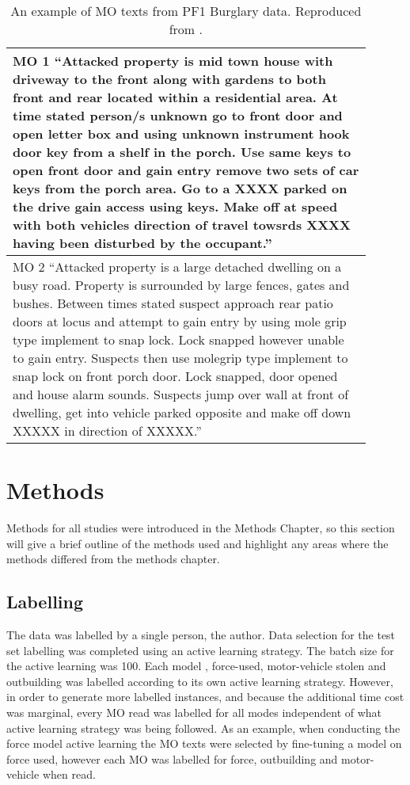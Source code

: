 \begin{table}[]
\begin{tabular}{p{0.9\linewidth}}
\toprule
MO 1 “Attacked property is mid town house with driveway to the front along with gardens to both front and rear located within a residential area. At time stated person/s unknown go to front door and open letter box and using unknown instrument hook door key from a shelf in the porch. Use same keys to open front door and gain entry remove two sets of car keys from the porch area. Go to a XXXX parked on the drive gain access using keys. Make off at speed with both vehicles direction of travel towsrds XXXX having been disturbed by the occupant.”             \\ \midrule
MO 2 “Attacked property is a large detached dwelling on a busy road. Property is surrounded by large fences, gates and bushes. Between times stated suspect approach rear patio doors at locus and attempt to gain entry by using mole grip type implement to snap lock. Lock snapped however unable to gain entry. Suspects then use molegrip type implement to snap lock on front porch door. Lock snapped, door opened and house alarm sounds. Suspects jump over wall at front of dwelling, get into vehicle parked opposite and make off down XXXXX in direction of XXXXX.” \\ \bottomrule
\end{tabular}
\caption[Example MO texts]{\label{tab:MOexample} An example of MO texts from PF1 Burglary data. Reproduced from \cite{birks}.}
\end{table}


\section{Methods} Methods for all studies were introduced in the Methods Chapter, so this section will give a brief outline of the methods used and highlight any areas where the methods differed from the methods chapter.

\subsection{Labelling} The data was labelled by a single person, the author. Data selection for the test set labelling was completed using an active learning strategy. The batch size for the active learning was 100. Each model , force-used, motor-vehicle stolen and outbuilding was labelled according to its own active learning strategy. However, in order to generate more labelled instances, and because the additional time cost was marginal, every MO read was labelled for all modes independent of what active learning strategy was being followed. As an example, when conducting the force model active learning the MO texts were selected by fine-tuning a model on force used, however each MO  was labelled for force, outbuilding and motor-vehicle when read.

